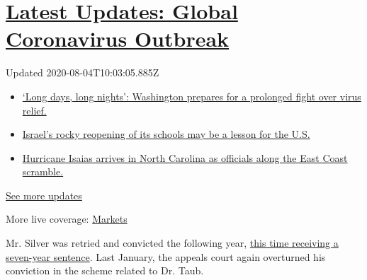 \hypertarget{latest-updates-global-coronavirus-outbreak}{%
\section{\texorpdfstring{\href{https://www.nytimes3xbfgragh.onion/2020/08/04/world/coronavirus-covid-19.html?action=click\&pgtype=Article\&state=default\&region=MAIN_CONTENT_1\&context=storylines_live_updates}{Latest
Updates: Global Coronavirus
Outbreak}}{Latest Updates: Global Coronavirus Outbreak}}\label{latest-updates-global-coronavirus-outbreak}}

Updated 2020-08-04T10:03:05.885Z

\begin{itemize}
\tightlist
\item
  \href{https://www.nytimes3xbfgragh.onion/2020/08/04/world/coronavirus-covid-19.html?action=click\&pgtype=Article\&state=default\&region=MAIN_CONTENT_1\&context=storylines_live_updates\#link-6b644638}{`Long
  days, long nights': Washington prepares for a prolonged fight over
  virus relief.}
\item
  \href{https://www.nytimes3xbfgragh.onion/2020/08/04/world/coronavirus-covid-19.html?action=click\&pgtype=Article\&state=default\&region=MAIN_CONTENT_1\&context=storylines_live_updates\#link-7af9fca0}{Israel's
  rocky reopening of its schools may be a lesson for the U.S.}
\item
  \href{https://www.nytimes3xbfgragh.onion/2020/08/04/world/coronavirus-covid-19.html?action=click\&pgtype=Article\&state=default\&region=MAIN_CONTENT_1\&context=storylines_live_updates\#link-33bf9168}{Hurricane
  Isaias arrives in North Carolina as officials along the East Coast
  scramble.}
\end{itemize}

\href{https://www.nytimes3xbfgragh.onion/2020/08/04/world/coronavirus-covid-19.html?action=click\&pgtype=Article\&state=default\&region=MAIN_CONTENT_1\&context=storylines_live_updates}{See
more updates}

More live coverage:
\href{https://www.nytimes3xbfgragh.onion/live/2020/08/04/business/stock-market-today-coronavirus?action=click\&pgtype=Article\&state=default\&region=MAIN_CONTENT_1\&context=storylines_live_updates}{Markets}

Mr. Silver was retried and convicted the following year,
\href{https://www.nytimes3xbfgragh.onion/2018/07/27/nyregion/sheldon-silver-sentencing-prison-corruption.html}{this
time receiving a seven-year sentence}. Last January, the appeals court
again overturned his conviction in the scheme related to Dr. Taub.

